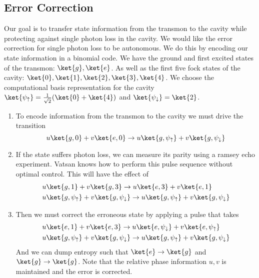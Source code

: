 \documentclass[letterpaper, 12pt]{article}
\begin{document}
\subsection{Error Correction}
Our goal is to transfer state information from the transmon to the cavity while protecting against single photon loss in the cavity. We would like the error correction for single photon loss to be autonomous. We do this by encoding our state information in a binomial code. We have the ground and first excited states of the transmon: $\ket{g}, \ket{e}$. As well as the first five fock states of the cavity: $\ket{0}, \ket{1}, \ket{2}, \ket{3}, \ket{4}$. We choose the computational basis representation for the cavity $\ket{\psi_{\uparrow}} = \frac{1}{\sqrt{2}}(\ket{0} + \ket{4})$ and $\ket{\psi_{\downarrow}} = \ket{2}$.
\begin{enumerate}
\item To encode information from the transmon to the cavity we must drive the transition \\
  \[
  u\ket{g, 0} + v\ket{e, 0} \rightarrow
  u\ket{g, \psi_{\uparrow}} + v\ket{g, \psi_{\downarrow}}
  \]
\item If the state suffers photon loss, we can measure its parity using a ramsey echo experiment. Vatsan knows how to perform this pulse sequence without optimal control. This will have the effect of
  \begin{align*}
    &u\ket{g, 1} + v\ket{g, 3} \rightarrow u\ket{e, 3} + v\ket{e, 1} \\
    &u\ket{g, \psi_{\uparrow}} + v\ket{g, \psi_{\downarrow}} \rightarrow u\ket{g, \psi_{\uparrow}} + v\ket{g, \psi_{\downarrow}}
  \end{align*}

\item Then we must correct the erroneous state by applying a pulse that takes
  \begin{align*}
    &u\ket{e, 1} + v\ket{e, 3} \rightarrow u\ket{e, \psi_{\downarrow}} + v\ket{e, \psi_{\uparrow}} \\
    &u\ket{g, \psi_{\uparrow}} + v\ket{g, \psi_{\downarrow}} \rightarrow u\ket{g, \psi_{\uparrow}} + v\ket{g, \psi_{\downarrow}}    
  \end{align*}
  And we can dump entropy such that $\ket{e} \rightarrow \ket{g}$ and $\ket{g} \rightarrow \ket{g}$. Note that the relative phase information $u, v$ is maintained and the error is corrected.
\end{enumerate}
\end{document}
